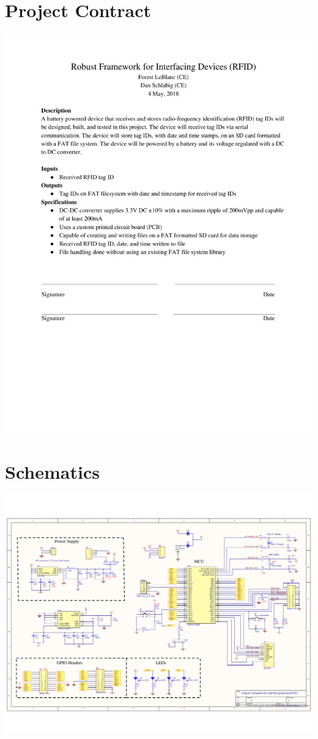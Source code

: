 \documentclass[11pt]{article}
\begin{document}
\section{Project Contract}
\label{sec:A_project_contract}
%
\includegraphics[width=\textwidth]{Figures/appendix/Contract.pdf}


\section{Schematics}
\includegraphics[scale=.75, angle=90]{Figures/appendix/senior_project_schem_REVB_3_1_2019_roughdraft.pdf}
\end{document}
